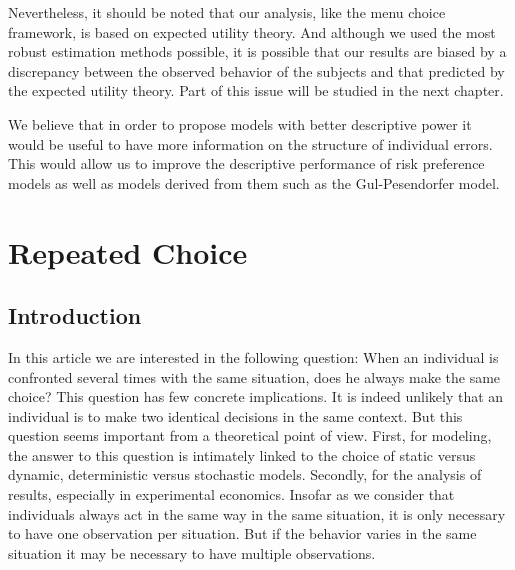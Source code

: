 \documentclass[
]{book}
\begin{document}
Nevertheless, it should be noted that our analysis, like the menu choice
framework, is based on expected utility theory.
And although we used the most robust estimation methods possible, it is possible
that our results are biased by a discrepancy between the observed behavior of
the subjects and that predicted by the expected utility theory.
Part of this issue will be studied in the next chapter.

We believe that in order to propose models with better descriptive power it
would be useful to have more information on the structure of individual errors.
This would allow us to improve the descriptive performance of risk preference
models as well as models derived from them such as the Gul-Pesendorfer model.

\hypertarget{multi-choice}{%
\chapter{Repeated Choice}\label{multi-choice}}

\hypertarget{intro4}{%
\section{Introduction}\label{intro4}}

In this article we are interested in the following question: When an
individual is confronted several times with the same situation, does he
always make the same choice? This question has few concrete
implications. It is indeed unlikely that an individual is to make two
identical decisions in the same context. But this question seems
important from a theoretical point of view. First, for modeling, the
answer to this question is intimately linked to the choice of
static versus dynamic, deterministic versus stochastic models.
Secondly, for the analysis of results, especially in experimental
economics. Insofar as we consider that individuals always act in the
same way in the same situation, it is only necessary to have one
observation per situation. But if the behavior varies in the same
situation it may be necessary to have multiple observations.
\end{document}
